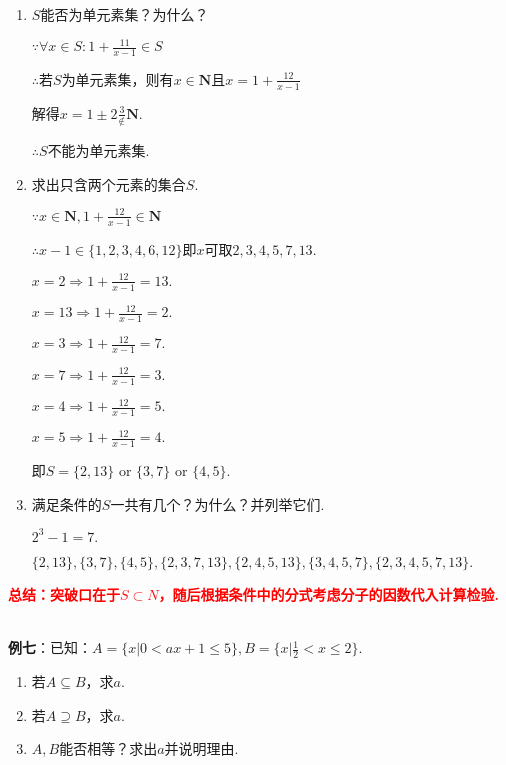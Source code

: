 \documentclass[8pt]{article}
\begin{document}
				\begin{enumerate}[label=$(\arabic*)$]

					\item $S$能否为单元素集？为什么？

						$\because \forall x\in S: 1+\frac{11}{x-1}\in S$

						$\therefore$若$S$为单元素集，则有$x\in\mathbf{N}$且$x=1+\frac{12}{x-1}$

						解得$x=1\pm 2\frac{3} \notin \mathbf{N}.$

						$\therefore S$不能为单元素集.

					\item 求出只含两个元素的集合$S$.

						$\because x\in\mathbf{N}, 1+\frac{12}{x-1}\in\mathbf{N}$

						$\therefore x-1\in\{1,2,3,4,6,12\}$即$x$可取$2,3,4,5,7,13.$

						$x=2 \Rightarrow 1+\frac{12}{x-1}=13.$

						$x=13 \Rightarrow 1+\frac{12}{x-1}=2.$

						$x=3 \Rightarrow 1+\frac{12}{x-1}=7.$

						$x=7 \Rightarrow 1+\frac{12}{x-1}=3.$

						$x=4 \Rightarrow 1+\frac{12}{x-1}=5.$

						$x=5 \Rightarrow 1+\frac{12}{x-1}=4.$

						即$S=\{2,13\}\text{ or }\{3,7\}\text{ or }\{4,5\}.$

					\item 满足条件的$S$一共有几个？为什么？并列举它们.

						$2^3-1=7.$

						$\{2,13\}, \{3,7\}, \{4,5\}, \{2,3,7,13\}, \{2,4,5,13\}, \{3,4,5,7\}, \{2,3,4,5,7,13\}.$
				
				\end{enumerate}

				\textcolor{red}{\textbf{总结：突破口在于$S\subset N$，随后根据条件中的分式考虑分子的因数代入计算检验.}}

				~\\

				\textbf{例七}：已知：$A=\{x|0<ax+1\leq 5\}, B=\{x|\frac{1}{2}<x\leq 2\}.$

				\begin{enumerate}[label=$(\arabic*)$]

					\item 若$A\subseteq B$，求$a$.
					\item 若$A\supseteq B$，求$a$.
					\item $A, B$能否相等？求出$a$并说明理由.

				\end{enumerate}
\end{document}
